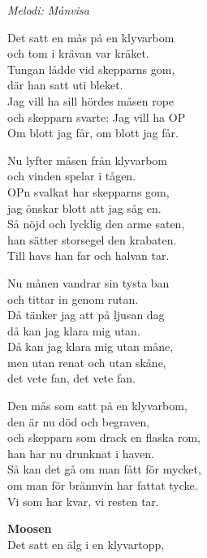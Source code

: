 {\footnotesize\textit{Melodi: Månvisa}}\par
\vspace{10pt}
Det satt en mås på en klyvarbom\\
och tom i krävan var kräket.\\
Tungan lådde vid skepparns gom,\\
där han satt uti bleket.\\
Jag vill ha sill hördes måsen rope\\
och skepparn svarte: Jag vill ha OP\\
Om blott jag får, om blott jag får.\par
\vspace{10pt}
Nu lyfter måsen från klyvarbom\\
och vinden spelar i tågen.\\
OPn svalkat har skepparns gom,\\
jag önskar blott att jag såg en.\\
Så nöjd och lycklig den arme saten,\\
han sätter storsegel den krabaten.\\
Till havs han far och halvan tar.\par
\vspace{10pt}
Nu månen vandrar sin tysta ban\\
och tittar in genom rutan.\\
Då tänker jag att på ljusan dag\\
då kan jag klara mig utan.\\
Då kan jag klara mig utan måne,\\ 
men utan renat och utan skåne,\\
det vete fan, det vete fan.\par
\vspace{10pt}
Den mås som satt på en klyvarbom,\\
den är nu död och begraven,\\
och skepparn som drack en flaska rom,\\
han har nu drunknat i haven.\\
Så kan det gå om man fått för mycket,\\
om man för brännvin har fattat tycke.\\
Vi som har kvar, vi resten tar.\par
\vspace{10pt}
\textbf{Moosen}\\
Det satt en älg i en klyvartopp,\\

